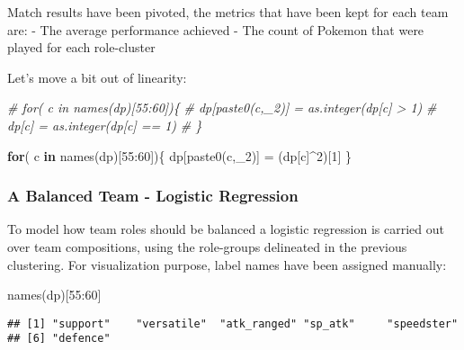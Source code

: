 \documentclass[
]{article}
\newenvironment{Shaded}{\begin{snugshade}}{\end{snugshade}}
\newcommand{\CommentTok}[1]{\textcolor[rgb]{0.56,0.35,0.01}{\textit{#1}}}
\newcommand{\ControlFlowTok}[1]{\textcolor[rgb]{0.13,0.29,0.53}{\textbf{#1}}}
\newcommand{\DecValTok}[1]{\textcolor[rgb]{0.00,0.00,0.81}{#1}}
\newcommand{\FunctionTok}[1]{\textcolor[rgb]{0.00,0.00,0.00}{#1}}
\newcommand{\NormalTok}[1]{#1}
\newcommand{\OtherTok}[1]{\textcolor[rgb]{0.56,0.35,0.01}{#1}}
\newcommand{\SpecialCharTok}[1]{\textcolor[rgb]{0.00,0.00,0.00}{#1}}
\newcommand{\StringTok}[1]{\textcolor[rgb]{0.31,0.60,0.02}{#1}}
\begin{document}
Match results have been pivoted, the metrics that have been kept for
each team are: - The average performance achieved - The count of Pokemon
that were played for each role-cluster

Let's move a bit out of linearity:

\begin{Shaded}
\begin{Highlighting}[]
\CommentTok{\# for( c in names(dp)[55:60])\{}
\CommentTok{\#   dp[paste0(c,\textquotesingle{}\_2\textquotesingle{})] = as.integer(dp[c] \textgreater{} 1)}
\CommentTok{\#   dp[c] = as.integer(dp[c] == 1)}
\CommentTok{\# \}}

\ControlFlowTok{for}\NormalTok{( c }\ControlFlowTok{in} \FunctionTok{names}\NormalTok{(dp)[}\DecValTok{55}\SpecialCharTok{:}\DecValTok{60}\NormalTok{])\{}
\NormalTok{  dp[}\FunctionTok{paste0}\NormalTok{(c,}\StringTok{\textquotesingle{}\_2\textquotesingle{}}\NormalTok{)] }\OtherTok{=}\NormalTok{ (dp[c]}\SpecialCharTok{\^{}}\DecValTok{2}\NormalTok{)[}\DecValTok{1}\NormalTok{]}
\NormalTok{\}}
\end{Highlighting}
\end{Shaded}

\hypertarget{a-balanced-team---logistic-regression}{%
\subsubsection{A Balanced Team - Logistic
Regression}\label{a-balanced-team---logistic-regression}}

To model how team roles should be balanced a logistic regression is
carried out over team compositions, using the role-groups delineated in
the previous clustering. For visualization purpose, label names have
been assigned manually:

\begin{Shaded}
\begin{Highlighting}[]
\FunctionTok{names}\NormalTok{(dp)[}\DecValTok{55}\SpecialCharTok{:}\DecValTok{60}\NormalTok{]}
\end{Highlighting}
\end{Shaded}

\begin{verbatim}
## [1] "support"    "versatile"  "atk_ranged" "sp_atk"     "speedster" 
## [6] "defence"
\end{verbatim}
\end{document}
